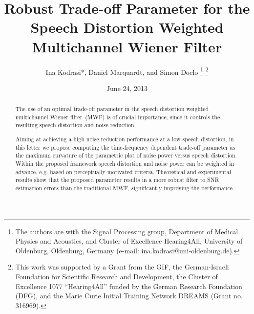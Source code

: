 \documentclass[10pt]{IEEEtran}
\begin{document}
\newlength\figureheight
\newlength\figurewidth
\setlength\figureheight{3.6cm}
\setlength\figurewidth{6.5cm}
\title{Robust Trade-off Parameter for the Speech Distortion Weighted Multichannel Wiener Filter}

\date{June 24, 2013}

\author{
Ina Kodrasi*, Daniel Marquardt, and Simon Doclo%
\thanks{The authors are with the Signal Processing group, Department of Medical Physics and Acoustics, and Cluster of Excellence Hearing4All, University of Oldenburg, Oldenburg, Germany (e-mail: ina.kodrasi@uni-oldenburg.de).}
\thanks{
This work was supported by a Grant from the GIF, the German-Israeli Foundation for Scientific Research and Development, the Cluster of Excellence 1077 ``Hearing4All'' funded by the German Research Foundation (DFG), and the Marie Curie Initial Training Network DREAMS (Grant no. 316969).}
}

\maketitle

\begin{abstract}
  The use of an optimal trade-off parameter in the speech distortion weighted multichannel Wiener filter~(MWF) is of crucial importance, since it controls the resulting speech distortion and noise reduction.

Aiming at achieving a high noise reduction performance at a low speech distortion, in this letter we propose computing the time-frequency dependent trade-off parameter as the maximum curvature of the parametric plot of noise power versus speech distortion.
Within the proposed framework speech distortion and noise power can be weighted in advance, e.g. based on perceptually motivated criteria.
Theoretical and experimental results show that the proposed parameter results in a more robust filter to SNR estimation errors than the traditional MWF, significantly improving the performance.

\end{abstract}
\end{document}
